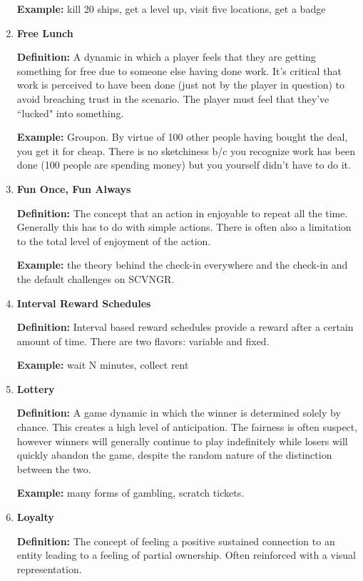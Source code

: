 \begin{enumerate}
\textbf{Example:} kill 20 ships, get a level up, visit five locations, get a badge

\item \textbf{Free Lunch}

\textbf{Definition:} A dynamic in which a player feels that they are getting something for free due to someone else having done work. It’s critical that work is perceived to have been done (just not by the player in question) to avoid breaching trust in the scenario. The player must feel that they’ve ``lucked" into something.

\textbf{Example:} Groupon. By virtue of 100 other people having bought the deal, you get it for cheap. There is no sketchiness b/c you recognize work has been done (100 people are spending money) but you yourself didn’t have to do it.

\item \textbf{Fun Once, Fun Always}

\textbf{Definition:} The concept that an action in enjoyable to repeat all the time. Generally this has to do with simple actions. There is often also a limitation to the total level of enjoyment of the action.

\textbf{Example:} the theory behind the check-in everywhere and the check-in and the default challenges on SCVNGR.

\item \textbf{Interval Reward Schedules}

\textbf{Definition:} Interval based reward schedules provide a reward after a certain amount of time. There are two flavors: variable and fixed.

\textbf{Example:} wait N minutes, collect rent

\item \textbf{Lottery}

\textbf{Definition:} A game dynamic in which the winner is determined solely by chance. This creates a high level of anticipation. The fairness is often suspect, however winners will generally continue to play indefinitely while losers will quickly abandon the game, despite the random nature of the distinction between the two.

\textbf{Example:} many forms of gambling, scratch tickets.

\item \textbf{Loyalty}

\textbf{Definition:} The concept of feeling a positive sustained connection to an entity leading to a feeling of partial ownership. Often reinforced with a visual representation.


\end{enumerate}
